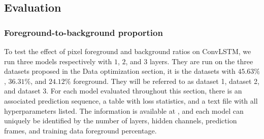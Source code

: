\documentclass[a4paper,12pt]{article}
\begin{document}
\subsection{Evaluation}
\subsubsection{Foreground-to-background proportion}
To test the effect of pixel foreground and background ratios on ConvLSTM, we run three models respectively with $1$, $2$, and $3$ layers. They are run on the three datasets proposed in the Data optimization section, it is the datasets with $45.63\%$, $36.31\%$, and $24.12\%$ foreground. They will be referred to as dataset 1, dataset 2, and dataset 3.
For each model evaluated throughout this section, there is an associated prediction sequence, a table with loss statistics, and a text file with all hyperparameters listed. The information is available at \cite{gagarahn2025bachelor}, and each model can uniquely be identified by the number of layers, hidden channels, prediction frames, and training data foreground percentage.
\end{document}
